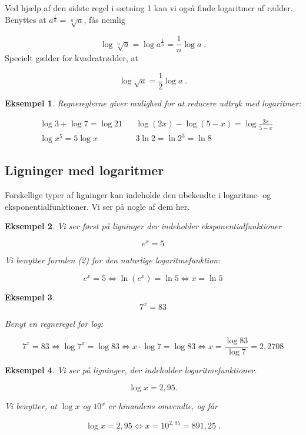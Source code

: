\documentclass[12pt,oneside,a4paper]{article}
\theoremstyle{plain}
\newtheorem*{eks}{Eksempel}
\begin{document}
Ved hjælp af den sidste regel i sætning 1 kan vi også finde logaritmer af
rødder. Benyttes at $a^{\frac{1}{n}} = \sqrt[n]{a}$, fås nemlig

\[
\log \sqrt[n]{a} = \log a^{\frac{1}{n}} = \frac{1}{n} \log a \; .
\]
Specielt gælder for kvadratrødder, at

\[
\log \sqrt{a} = \frac{1}{2} \log a \; .
\]

\begin{eks}

Regnereglerne giver mulighed for at reducere udtryk med logaritmer:

\[
\begin{aligned}
    &\log 3 + \log 7 = \log 21 && \log (2x) - \log (5 - x) = \log \frac{2x}{5 - x} \\
    &\log x^5 = 5 \log x && 3 \ln 2 = \ln 2^3 = \ln 8
\end{aligned}
\]
\end{eks}

\subsection*{Ligninger med logaritmer}
Forskellige typer af ligninger kan indeholde den ubekendte i logaritme- og
eksponentialfunktioner. Vi ser på nogle af dem her.

\begin{eks}
Vi ser først på ligninger der indeholder eksponentialfunktioner

\[
e^x = 5
\]

Vi benytter formlen (2) for den naturlige logaritmefunktion:

\[
e^x = 5 \iff \ln (e^x) = \ln 5 \iff x = \ln 5
\]
\end{eks}

\begin{eks}
\[
    7^x = 83
\]

Benyt en regneregel for log:

\[
7^x = 83 \iff \log 7^x = \log 83 \iff
x \cdot \log 7 = \log 83 \iff x = \frac{\log 83}{\log 7} = 2,2708
\]
\end{eks}


\begin{eks}

Vi ser på ligninger, der indeholder logaritmefunktioner. 

\[
\log x = 2,95.
\]

Vi benytter, at $\log x$ og $10^x$ er hinandens omvendte, og får

\[
\log x = 2,95 \iff x = 10^{2,95} = 891,25 \; .
\]
\end{eks}
\end{document}
